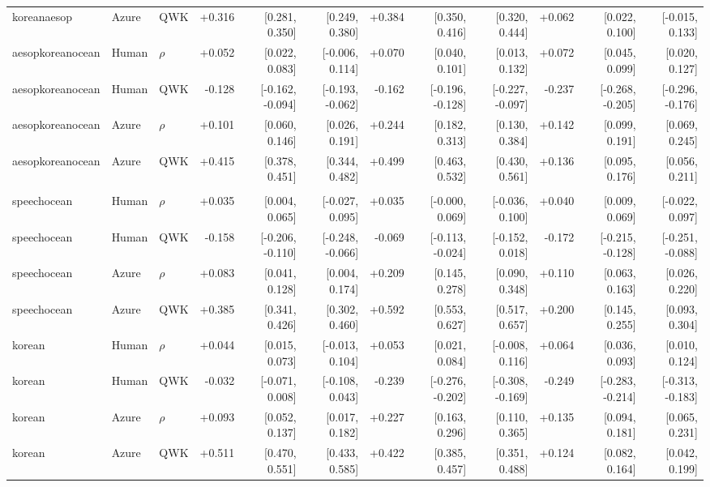 \documentclass[10pt]{article}
\begin{document}
\begin{landscape}
\begin{longtable}{@{}lllrrrrrrrrr@{}}
koreanaesop & Azure & QWK & +0.316 & [0.281, 0.350] & [0.249, 0.380] & +0.384 & [0.350, 0.416] & [0.320, 0.444] & +0.062 & [0.022, 0.100] & [-0.015, 0.133]\\
\addlinespace[2pt]
aesopkoreanocean & Human & $\rho$ & +0.052 & [0.022, 0.083] & [-0.006, 0.114] & +0.070 & [0.040, 0.101] & [0.013, 0.132] & +0.072 & [0.045, 0.099] & [0.020, 0.127]\\
aesopkoreanocean & Human & QWK & -0.128 & [-0.162, -0.094] & [-0.193, -0.062] & -0.162 & [-0.196, -0.128] & [-0.227, -0.097] & -0.237 & [-0.268, -0.205] & [-0.296, -0.176]\\
aesopkoreanocean & Azure & $\rho$ & +0.101 & [0.060, 0.146] & [0.026, 0.191] & +0.244 & [0.182, 0.313] & [0.130, 0.384] & +0.142 & [0.099, 0.191] & [0.069, 0.245]\\
aesopkoreanocean & Azure & QWK & +0.415 & [0.378, 0.451] & [0.344, 0.482] & +0.499 & [0.463, 0.532] & [0.430, 0.561] & +0.136 & [0.095, 0.176] & [0.056, 0.211]\\
\addlinespace[2pt]
\midrule\multicolumn{12}{l}{\textbf{H: historical-grid accuracy MAE}}\\*
speechocean & Human & $\rho$ & +0.035 & [0.004, 0.065] & [-0.027, 0.095] & +0.035 & [-0.000, 0.069] & [-0.036, 0.100] & +0.040 & [0.009, 0.069] & [-0.022, 0.097]\\
speechocean & Human & QWK & -0.158 & [-0.206, -0.110] & [-0.248, -0.066] & -0.069 & [-0.113, -0.024] & [-0.152, 0.018] & -0.172 & [-0.215, -0.128] & [-0.251, -0.088]\\
speechocean & Azure & $\rho$ & +0.083 & [0.041, 0.128] & [0.004, 0.174] & +0.209 & [0.145, 0.278] & [0.090, 0.348] & +0.110 & [0.063, 0.163] & [0.026, 0.220]\\
speechocean & Azure & QWK & +0.385 & [0.341, 0.426] & [0.302, 0.460] & +0.592 & [0.553, 0.627] & [0.517, 0.657] & +0.200 & [0.145, 0.255] & [0.093, 0.304]\\
\addlinespace[2pt]
korean & Human & $\rho$ & +0.044 & [0.015, 0.073] & [-0.013, 0.104] & +0.053 & [0.021, 0.084] & [-0.008, 0.116] & +0.064 & [0.036, 0.093] & [0.010, 0.124]\\
korean & Human & QWK & -0.032 & [-0.071, 0.008] & [-0.108, 0.043] & -0.239 & [-0.276, -0.202] & [-0.308, -0.169] & -0.249 & [-0.283, -0.214] & [-0.313, -0.183]\\
korean & Azure & $\rho$ & +0.093 & [0.052, 0.137] & [0.017, 0.182] & +0.227 & [0.163, 0.296] & [0.110, 0.365] & +0.135 & [0.094, 0.181] & [0.065, 0.231]\\
korean & Azure & QWK & +0.511 & [0.470, 0.551] & [0.433, 0.585] & +0.422 & [0.385, 0.457] & [0.351, 0.488] & +0.124 & [0.082, 0.164] & [0.042, 0.199]\\

\end{longtable}
\end{landscape}
\end{document}
